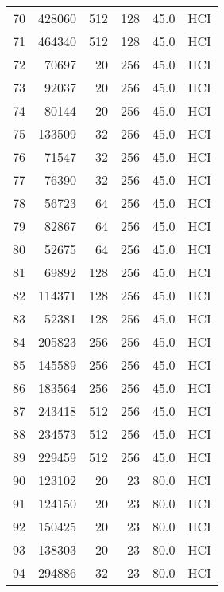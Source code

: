 \begin{longtable}{lrrrrl}
70  &    428060 &        512 &       128 &           45.0 &  HCI \\
71  &    464340 &        512 &       128 &           45.0 &  HCI \\
72  &     70697 &         20 &       256 &           45.0 &  HCI \\
73  &     92037 &         20 &       256 &           45.0 &  HCI \\
74  &     80144 &         20 &       256 &           45.0 &  HCI \\
75  &    133509 &         32 &       256 &           45.0 &  HCI \\
76  &     71547 &         32 &       256 &           45.0 &  HCI \\
77  &     76390 &         32 &       256 &           45.0 &  HCI \\
78  &     56723 &         64 &       256 &           45.0 &  HCI \\
79  &     82867 &         64 &       256 &           45.0 &  HCI \\
80  &     52675 &         64 &       256 &           45.0 &  HCI \\
81  &     69892 &        128 &       256 &           45.0 &  HCI \\
82  &    114371 &        128 &       256 &           45.0 &  HCI \\
83  &     52381 &        128 &       256 &           45.0 &  HCI \\
84  &    205823 &        256 &       256 &           45.0 &  HCI \\
85  &    145589 &        256 &       256 &           45.0 &  HCI \\
86  &    183564 &        256 &       256 &           45.0 &  HCI \\
87  &    243418 &        512 &       256 &           45.0 &  HCI \\
88  &    234573 &        512 &       256 &           45.0 &  HCI \\
89  &    229459 &        512 &       256 &           45.0 &  HCI \\
90  &    123102 &         20 &        23 &           80.0 &  HCI \\
91  &    124150 &         20 &        23 &           80.0 &  HCI \\
92  &    150425 &         20 &        23 &           80.0 &  HCI \\
93  &    138303 &         20 &        23 &           80.0 &  HCI \\
94  &    294886 &         32 &        23 &           80.0 &  HCI \\

\end{longtable}

